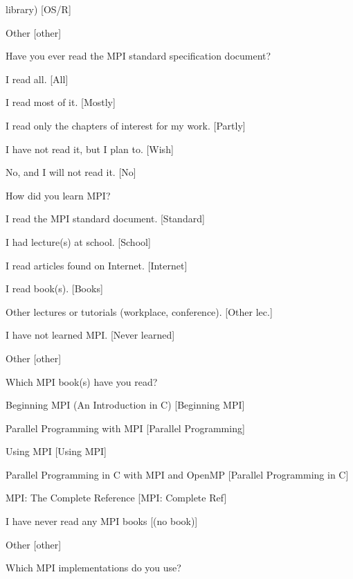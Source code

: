 \documentclass[conference,10pt,letterpaper]{IEEEtran}
\begin{document}
{{\begin{description}
\begin{inparaenum}[{\bf C}1)]
      library) [OS/R]
    \item Other [other]
    \end{inparaenum}
  \item[Q9:] Have you ever read the MPI standard specification document?
    \begin{inparaenum}[{\bf C}1)]
    \item I read all. [All]
    \item I read most of it. [Mostly]
    \item I read only the chapters of interest for my work. [Partly]
    \item I have not read it, but I plan to. [Wish]
    \item No, and I will not read it. [No]
    \end{inparaenum}
  \item[Q10*:] How did you learn MPI?
    \begin{inparaenum}[{\bf C}1)]
    \item I read the MPI standard document. [Standard]
    \item I had lecture(s) at school. [School]
    \item I read articles found on Internet. [Internet]
    \item I read book(s). [Books]
    \item Other lectures or tutorials (workplace, conference). [Other lec.]
    \item I have not learned MPI. [Never learned]
    \item Other [other]
    \end{inparaenum}
  \item[Q11*:] Which MPI book(s) have you read?
    \begin{inparaenum}[{\bf C}1)]
    \item Beginning MPI (An Introduction in C) [Beginning MPI]
    \item Parallel Programming with MPI [Parallel Programming]
    \item Using MPI [Using MPI]
    \item Parallel Programming in C with MPI and OpenMP [Parallel
      Programming in C]
    \item MPI: The Complete Reference [MPI: Complete Ref]
    \item I have never read any MPI books [(no book)]
    \item Other [other]
    \end{inparaenum}
  \item[Q12*:] Which MPI implementations do you use?

\end{description}}}
\end{document}
